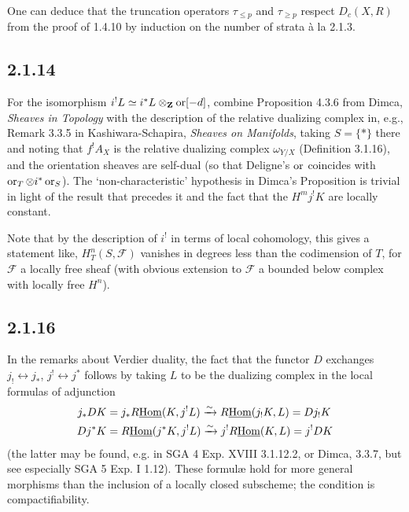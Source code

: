 \documentclass[deligne.tex]{subfiles}
\begin{document}
	One can deduce that the truncation operators $\tau_{\leq p}$ and
	$\tau_{\geq p}$ respect $D_c(X,R)$ from the proof of 
	1.4.10 by induction on the number of strata à la 2.1.3.
	
	\subsection*{2.1.14} For the isomorphism $i^!L\simeq i^*L\otimes_{\mathbf{Z}}\operatorname{or}[-d]$,
	combine Proposition 4.3.6 from Dimca, \emph{Sheaves in Topology} with
	the description of the relative dualizing complex in, e.g.,
	Remark 3.3.5 in Kashiwara-Schapira, \emph{Sheaves on Manifolds}, taking
	$S=\{\ast\}$ there and noting
	that $f^!A_X$ is the relative dualizing complex $\omega_{Y/X}$
	(Definition 3.1.16), and the orientation sheaves are self-dual
	(so that Deligne's $\operatorname{or}$ coincides with $\operatorname{or}_T\otimes i^*\operatorname{or}_S$).
	The `non-characteristic' hypothesis in Dimca's Proposition is trivial
	in light of the result that precedes it and the fact that the
	$H^mj^!K$ are locally constant.
	
	Note that by the description of $i^!$ in terms of local cohomology,
	this gives a statement like, $H^n_T(S,\mathcal F)$ vanishes in degrees
	less than the codimension of $T$, for $\mathcal F$ a locally free sheaf
	(with obvious extension to $\mathcal F$ a bounded below
	complex with locally free $H^n$).
	
	\subsection*{2.1.16}\label{BBD:2.1.16}
	In the remarks about Verdier duality, the fact that the functor $D$
	exchanges $j_!\leftrightarrow j_*$, $j^!\leftrightarrow j^*$ follows by 
	taking $L$ to be the dualizing complex in the local formulas of adjunction
	\begin{align*}
		j_*DK&=j_*R\underline{\operatorname{Hom}}(K,j^!L)\xrightarrow{\sim}
		R\underline{\operatorname{Hom}}(j_!K,L)=Dj_!K \\
		Dj^*K&=R\underline{\operatorname{Hom}}(j^*K,j^!L)\xrightarrow{\sim}
		j^!R\underline{\operatorname{Hom}}(K,L)=j^!DK
	\end{align*}
	(the latter may be found, e.g. in SGA 4 Exp. XVIII 3.1.12.2,
	or Dimca, 3.3.7, but see especially SGA 5 Exp. I 1.12).
	These formulæ hold for more general morphisms than the inclusion of a locally closed subscheme; the condition is compactifiability.
\end{document}
